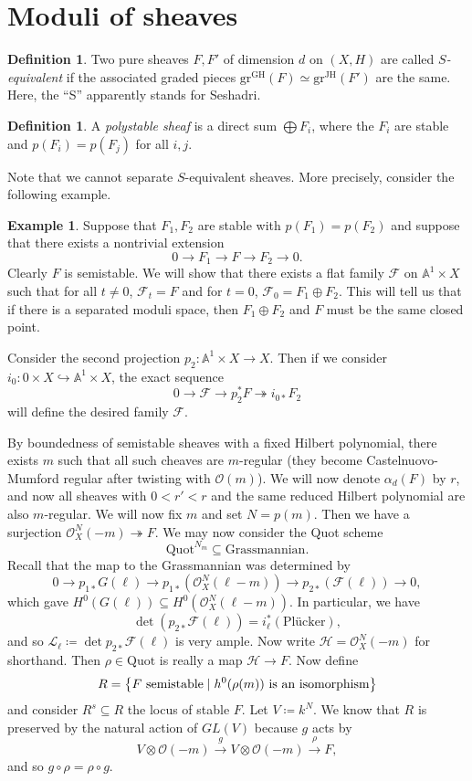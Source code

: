 \documentclass[leqno, openany]{memoir}
\theoremstyle{definition}
\newtheorem{defn}[thm]{Definition}
\newtheorem{exm}[thm]{Example}
\theoremstyle{remark}
\theoremstyle{plain}
\theoremstyle{definition}
\theoremstyle{remark}
\newcommand{\A}{\mathbb{A}}
\newcommand{\mc}[1]{\mathcal{#1}}
\newcommand{\mr}[1]{\mathrm{#1}}
\begin{document}
\section{Moduli of sheaves}%
\label{sec:moduli_of_sheaves}

\begin{defn}
    Two pure sheaves $F, F'$ of dimension $d$ on $(X, H)$ are called \textit{$S$-equivalent} if the associated graded pieces $\mr{gr}^{\mr{GH}}(F) \simeq \mr{gr}^{\mr{JH}}(F')$ are the same. Here, the ``S'' apparently stands for Seshadri.
\end{defn}

\begin{defn}
    A \textit{polystable sheaf} is a direct sum $\bigoplus F_i$, where the $F_i$ are stable and $p(F_i) = p(F_j)$ for all $i, j$.
\end{defn}

Note that we cannot separate $S$-equivalent sheaves. More precisely, consider the following example.
\begin{exm}
    Suppose that $F_1, F_2$ are stable with $p(F_1) = p(F_2)$ and suppose that there exists a nontrivial extension
    \[ 0 \to F_1 \to F \to F_2 \to 0. \]
    Clearly $F$ is semistable. We will show that there exists a flat family $\mc{F}$ on $\A^1 \times X$ such that for all $t \neq 0$, $\mc{F}_t = F$ and for $t = 0$, $\mc{F}_0 = F_1 \oplus F_2$. This will tell us that if there is a separated moduli space, then $F_1 \oplus F_2$ and $F$ must be the same closed point.

    Consider the second projection $p_2 \colon \A^1 \times X \to X$. Then if we consider $i_0 \colon \qty{0} \times X \hookrightarrow \A^1 \times X$, the exact sequence
    \[ 0 \to \mc{F} \to p_2^* F \twoheadrightarrow i_{0*} F_2 \]
    will define the desired family $\mc{F}$.
\end{exm}

By boundedness of semistable sheaves with a fixed Hilbert polynomial, there exists $m$ such that all such cheaves are $m$-regular (they become Castelnuovo-Mumford regular after twisting with $\mc{O}(m)$). We will now denote $\alpha_d(F)$ by $r$, and now all sheaves with $0 < r' < r$ and the same reduced Hilbert polynomial are also $m$-regular. We will now fix $m$ and set $N = p(m)$. Then we have a surjection $\mc{O}_X^N(-m) \twoheadrightarrow F$. We may now consider the Quot scheme
\[ \mr{Quot}^{N_m} \subseteq \mr{Grassmannian}. \]
Recall that the map to the Grassmannian was determined by
\[ 0 \to p_{1*} G(\ell) \to p_{1*}(\mc{O}_X^N(\ell - m)) \to p_{2*}(\mc{F}(\ell)) \to 0, \]
which gave $H^0(G(\ell)) \subseteq H^0(\mc{O}_X^N(\ell - m))$. In particular, we have
\[ \det (p_{2*} \mc{F}(\ell)) = i_{\ell}^* (\text{Pl\"ucker}), \]
and so $\mc{L}_{\ell} \coloneqq \det p_{2*} \mc{F}(\ell)$ is very ample. Now write $\mc{H} = \mc{O}_X^N(-m)$ for shorthand. Then $\rho \in \mr{Quot}$ is really a map $\mc{H} \to F$. Now define
\[ R = \qty{F \text{ semistable} \mid h^0(\rho(m)) \text{ is an isomorphism}} \]
and consider $R^s \subseteq R$ the locus of stable $F$. Let $V \coloneqq k^N$. We know that $R$ is preserved by the natural action of $GL(V)$ because $g$ acts by
\[ V \otimes \mc{O}(-m) \xrightarrow{g} V \otimes \mc{O}(-m) \xrightarrow{\rho} F, \]
and so $g \circ \rho = \rho \circ g$.
\end{document}
